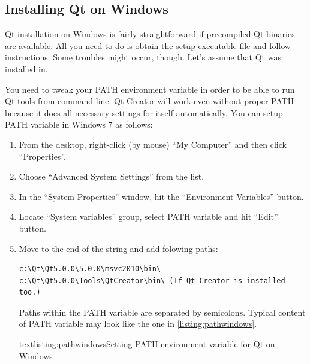 \subsection{Installing Qt on Windows}
Qt installation on Windows is fairly straightforward if precompiled Qt binaries are available. All you need to do is obtain the setup executable file and follow instructions. Some troubles might occur, though. Let's assume that Qt was installed in.

You need to tweak your PATH environment variable in order to be able to run Qt tools from command line. Qt Creator will work even without proper PATH because it does all necessary settings for itself automatically. You can setup PATH variable in Windows 7 as follows:
\begin{enumerate}
\item From the desktop, right-click (by mouse) \enquote{My Computer} and then click \enquote{Properties}.
\item Choose \enquote{Advanced System Settings} from the list.
\item In the \enquote{System Properties} window, hit the \enquote{Environment Variables} button.
\item Locate \enquote{System variables} group, select PATH variable and hit \enquote{Edit} button.
\item Move to the end of the string and add folowing paths:
\begin{lstlisting}[firstnumber=1,language=text]
c:\Qt\Qt5.0.0\5.0.0\msvc2010\bin\
c:\Qt\Qt5.0.0\Tools\QtCreator\bin\ (If Qt Creator is installed too.)
\end{lstlisting}
Paths within the PATH variable are separated by semicolons. Typical content of PATH variable may look like the one in \autoref{listing:pathwindows}.
\begin{fdoccode}{text}{listing:pathwindows}{Setting PATH environment variable for Qt on Windows}
\end{fdoccode}
\end{enumerate}

